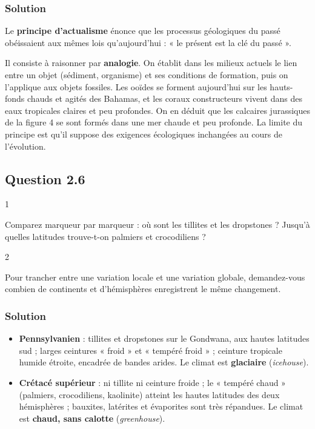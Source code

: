 \documentclass[11pt,a4paper]{article}
\providecommand{\tightlist}{\setlength{\itemsep}{0pt}\setlength{\parskip}{0pt}}
\begin{document}
\hypertarget{solution-15}{%
\subsubsection{Solution}\label{solution-15}}

Le \textbf{principe d'actualisme} énonce que les processus géologiques du passé obéissaient aux mêmes lois qu'aujourd'hui : « le présent est la clé du passé ».

Il consiste à raisonner par \textbf{analogie}. On établit dans les milieux actuels le lien entre un objet (sédiment, organisme) et ses conditions de formation, puis on l'applique aux objets fossiles. Les ooïdes se forment aujourd'hui sur les hauts-fonds chauds et agités des Bahamas, et les coraux constructeurs vivent dans des eaux tropicales claires et peu profondes. On en déduit que les calcaires jurassiques de la figure 4 se sont formés dans une mer chaude et peu profonde. La limite du principe est qu'il suppose des exigences écologiques inchangées au cours de l'évolution.

\hypertarget{question-2.6}{%
\subsection{Question 2.6}\label{question-2.6}}

\begin{indication}{1}

Comparez marqueur par marqueur : où sont les tillites et les dropstones ? Jusqu'à quelles latitudes trouve-t-on palmiers et crocodiliens ?

\end{indication}

\begin{indication}{2}

Pour trancher entre une variation locale et une variation globale, demandez-vous combien de continents et d'hémisphères enregistrent le même changement.

\end{indication}

\hypertarget{solution-16}{%
\subsubsection{Solution}\label{solution-16}}

\begin{itemize}
\tightlist
\item
  \textbf{Pennsylvanien} : tillites et dropstones sur le Gondwana, aux hautes latitudes sud ; larges ceintures « froid » et « tempéré froid » ; ceinture tropicale humide étroite, encadrée de bandes arides. Le climat est \textbf{glaciaire} (\emph{icehouse}).
\item
  \textbf{Crétacé supérieur} : ni tillite ni ceinture froide ; le « tempéré chaud » (palmiers, crocodiliens, kaolinite) atteint les hautes latitudes des deux hémisphères ; bauxites, latérites et évaporites sont très répandues. Le climat est \textbf{chaud, sans calotte} (\emph{greenhouse}).
\end{itemize}
\end{document}
